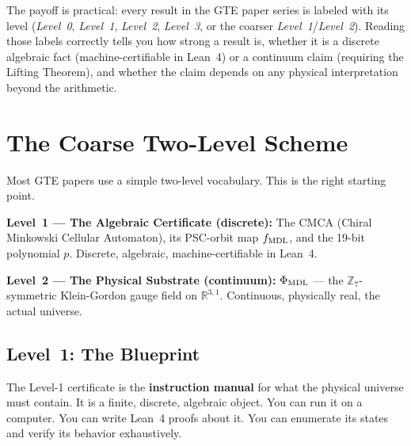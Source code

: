 \documentclass[11pt,a4paper]{article}
\newcommand{\term}[1]{\textbf{#1}}
\newcommand{\PhiMDL}{\Phi_{\rm MDL}}
\newcommand{\ZS}{\mathbb{Z}_7}
\newcommand{\poly}{p}
\newcommand{\fMDL}{f_{\rm MDL}}
\begin{document}
\medskip
The payoff is practical: every result in the GTE paper series is labeled
with its level (\emph{Level~0}, \emph{Level~1}, \emph{Level~2},
\emph{Level~3}, or the coarser \emph{Level~1}/\emph{Level~2}).
Reading those labels correctly tells you how strong a result is, whether
it is a discrete algebraic fact (machine-certifiable in Lean~4) or a
continuum claim (requiring the Lifting Theorem), and whether the claim
depends on any physical interpretation beyond the arithmetic.

\section{The Coarse Two-Level Scheme}
\label{sec:coarse}

Most GTE papers use a simple two-level vocabulary.
This is the right starting point.

\begin{tcolorbox}[colback=boxorange,colframe=orange!60!black,
  title=The fundamental distinction (coarse two-level scheme)]
\textbf{Level~1 --- The Algebraic Certificate (discrete):}
The CMCA (Chiral Minkowski Cellular Automaton), its PSC-orbit map $\fMDL$,
and the 19-bit polynomial $\poly$.
Discrete, algebraic, machine-certifiable in Lean~4.

\medskip\noindent
\textbf{Level~2 --- The Physical Substrate (continuum):}
$\PhiMDL$ --- the $\ZS$-symmetric Klein-Gordon gauge field on
$\mathbb{R}^{3,1}$.
Continuous, physically real, the actual universe.
\end{tcolorbox}

\subsection{Level~1: The Blueprint}

The Level-1 certificate is the \term{instruction manual} for what the
physical universe must contain.
It is a finite, discrete, algebraic object.
You can run it on a computer.
You can write Lean~4 proofs about it.
You can enumerate its states and verify its behavior exhaustively.
\end{document}
